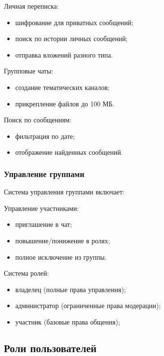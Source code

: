 Личная переписка:

\begin{itemize}
	\item шифрование для приватных сообщений;
	\item поиск по истории личных сообщений;
	\item отправка вложений разного типа.
\end{itemize}

Групповые чаты:

\begin{itemize}
	\item создание тематических каналов;
	\item прикрепление файлов до 100 МБ.
\end{itemize}

Поиск по сообщениям:

\begin{itemize}
	\item фильтрация по дате;
	\item отображение найденных сообщений.
\end{itemize}

\subsubsection{Управление группами}

Система управления группами включает:

Управление участниками:

\begin{itemize}
	\item приглашение в чат;
	\item повышение/понижение в ролях;
	\item полное исключение из группы.
\end{itemize}

Система ролей:

\begin{itemize}
	\item владелец (полные права управления);
	\item администратор (ограниченные права модерации);
	\item участник (базовые права общения);
\end{itemize}


\subsection{Роли пользователей}

